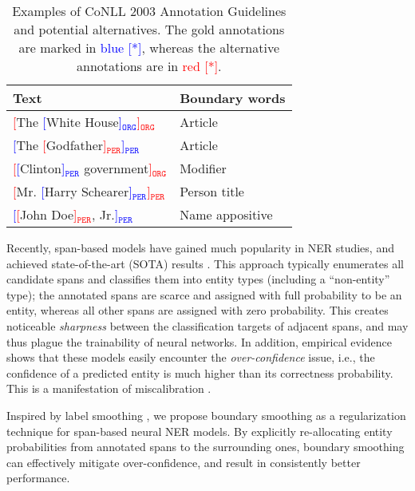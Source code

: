\documentclass[11pt]{article}
\begin{document}
\begin{table}[t]
    \centering \small
    \begin{tabular}{ll}
        \toprule
        Text & Boundary words \\
        \midrule
        \textcolor{red}{[}The \textcolor{blue}{[}White House\textcolor{blue}{]$_\texttt{ORG}$}\textcolor{red}{]$_\texttt{ORG}$} & Article \\
        \midrule
        \textcolor{blue}{[}The \textcolor{red}{[}Godfather\textcolor{red}{]$_\texttt{PER}$}\textcolor{blue}{]$_\texttt{PER}$} & Article \\
        \midrule
        \textcolor{red}{[}\textcolor{blue}{[}Clinton\textcolor{blue}{]$_\texttt{PER}$} government\textcolor{red}{]$_\texttt{ORG}$} & Modifier \\
        \midrule
        \textcolor{red}{[}Mr. \textcolor{blue}{[}Harry Schearer\textcolor{blue}{]$_\texttt{PER}$}\textcolor{red}{]$_\texttt{PER}$} & Person title \\
        \midrule
        \textcolor{blue}{[}\textcolor{red}{[}John Doe\textcolor{red}{]$_\texttt{PER}$}, Jr.\textcolor{blue}{]$_\texttt{PER}$} & Name appositive \\
        \bottomrule
    \end{tabular}
    \caption{Examples of CoNLL 2003 Annotation Guidelines and potential alternatives. The gold annotations are marked in \textcolor{blue}{blue [*]}, whereas the alternative annotations are in \textcolor{red}{red [*]}.}
    \label{tab:conll2003-examples}
\end{table}

Recently, span-based models have gained much popularity in NER studies, and achieved state-of-the-art (SOTA) results \citep{eberts2019span,yu-etal-2020-named,li-etal-2021-span}. This approach typically enumerates all candidate spans and classifies them into entity types (including a ``non-entity'' type); the annotated spans are scarce and assigned with full probability to be an entity, whereas all other spans are assigned with zero probability. This creates noticeable \emph{sharpness} between the classification targets of adjacent spans, and may thus plague the trainability of neural networks. In addition, empirical evidence shows that these models easily encounter the \emph{over-confidence} issue, i.e., the confidence of a predicted entity is much higher than its correctness probability. This is a manifestation of miscalibration \citep{guo2017calibration}. 

Inspired by label smoothing \citep{szegedy2016rethinking,muller2019when}, we propose boundary smoothing as a regularization technique for span-based neural NER models. By explicitly re-allocating entity probabilities from annotated spans to the surrounding ones, boundary smoothing can effectively mitigate over-confidence, and result in consistently better performance. 
\end{document}
